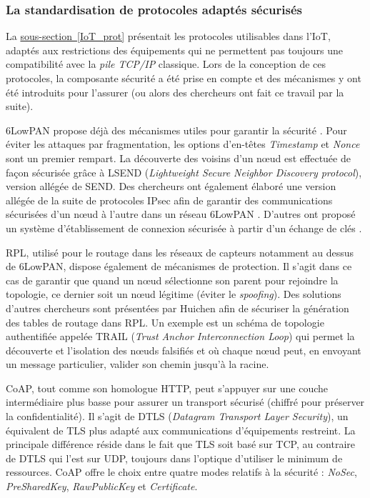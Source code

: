 \documentclass[]{article}
\newcommand{\wordlink}[2]{\hyperref[#1]{#2~\ref{#1}}}
\begin{document}
\subsubsection{La standardisation de protocoles adaptés sécurisés}

\par La \wordlink{IoT_prot}{sous-section} présentait les protocoles utilisables dans l'IoT, adaptés aux restrictions des équipements qui ne permettent pas toujours une compatibilité avec la \textit{pile TCP/IP} classique. Lors de la conception de ces protocoles, la composante sécurité a été prise en compte et des mécanismes y ont été introduits pour l'assurer \cite{Huichen2016} (ou alors des chercheurs ont fait ce travail par la suite).\\

\par 6LowPAN propose déjà des mécanismes utiles pour garantir la sécurité \cite{wiki6lowpan}. Pour éviter les attaques par fragmentation, les options d'en-têtes \textit{Timestamp} et \textit{Nonce} sont un premier rempart. La découverte des voisins d'un nœud est effectuée de façon sécurisée grâce à LSEND (\textit{Lightweight Secure Neighbor Discovery protocol}), version allégée de SEND. Des chercheurs ont également élaboré une version allégée de la suite de protocoles IPsec afin de garantir des communications sécurisées d'un nœud à l'autre dans un réseau 6LowPAN \cite{Huichen2016}. D'autres ont proposé un système d'établissement de connexion sécurisée à partir d'un échange de clés \cite{Huichen2016}.\\

\par RPL, utilisé pour le routage dans les réseaux de capteurs notamment au dessus de 6LowPAN, dispose également de mécanismes de protection. Il s'agit dans ce cas de garantir que quand un nœud sélectionne son parent pour rejoindre la topologie, ce dernier soit un nœud légitime (éviter le \textit{spoofing}). Des solutions d'autres chercheurs sont présentées par Huichen \cite{Huichen2016} afin de sécuriser la génération des tables de routage dans RPL. Un exemple est un schéma de topologie authentifiée appelée TRAIL (\textit{Trust Anchor Interconnection Loop}) qui permet la découverte et l'isolation des nœuds falsifiés et où chaque nœud peut, en envoyant un message particulier, valider son chemin jusqu'à la racine.\\

\par CoAP, tout comme son homologue HTTP, peut s'appuyer sur une couche intermédiaire plus basse pour assurer un transport sécurisé (chiffré pour préserver la confidentialité). Il s'agit de DTLS (\textit{Datagram Transport Layer Security}), un équivalent de TLS plus adapté aux communications d'équipements restreint. La principale différence réside dans le fait que TLS soit basé sur TCP, au contraire de DTLS qui l'est sur UDP, toujours dans l'optique d'utiliser le minimum de ressources. CoAP offre le choix entre quatre modes relatifs à la sécurité : \textit{NoSec}, \textit{PreSharedKey}, \textit{RawPublicKey} et \textit{Certificate}.
\end{document}
